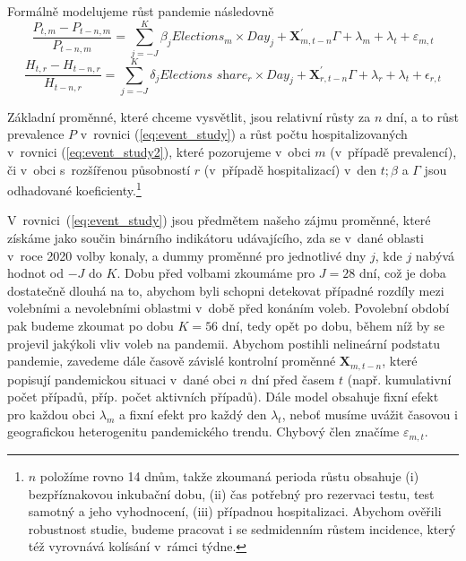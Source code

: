 Formálně modelujeme růst pandemie následovně
\begin{equation}
\label{eq:event_study}
\frac{P_{t,m} - P_{t-n,m}}{P_{t-n,m}} = \sum_{j=-J}^{K} \beta_j \textit{Elections}_m \times Day_j + \textbf{X}_{m,t-n}^{'}\Gamma + \lambda_{m} + \lambda_{t} + \varepsilon_{m,t}
\end{equation}
\begin{equation}
\label{eq:event_study2}
\frac{H_{t,r} - H_{t-n,r}}{H_{t-n,r}} = \sum_{j=-J}^{K} \delta_j \textit{Elections share}_r \times Day_j + \textbf{X}_{r,t-n}^{'}\Gamma + \lambda_{r} + \lambda_{t} + \epsilon_{r,t}
\end{equation}

Základní proměnné, které chceme vysvětlit, jsou relativní růsty za $n$ dní, a to růst prevalence $P$ v~rovnici (\ref{eq:event_study}) a růst počtu hospitalizovaných v~rovnici (\ref{eq:event_study2}), které pozorujeme v~obci $m$ (v~případě prevalencí), či v~obci s~rozšířenou působností $r$ (v~případě hospitalizací) v~den $t; \beta$ a $\Gamma$ jsou odhadované koeficienty.\footnote{$n$ položíme rovno 14 dnům, takže zkoumaná perioda růstu obsahuje
(i) bezpříznakovou inkubační dobu\cite{lauer_et_al2020}, (ii) čas potřebný pro rezervaci testu, test samotný a jeho vyhodnocení, (iii) případnou hospitalizaci. Abychom ověřili robustnost studie, budeme pracovat i se sedmidenním růstem incidence, který též vyrovnává kolísání v~rámci týdne.}


V~rovnici~(\ref{eq:event_study}) jsou předmětem našeho zájmu proměnné, které získáme jako součin binárního indikátoru udávajícího, zda se v~dané oblasti v~roce 2020 volby konaly, a dummy proměnné pro jednotlivé dny $j$, kde $j$ nabývá hodnot od $-J$ do $K$. 
Dobu před volbami zkoumáme pro $J=28$ dní, což je doba dostatečně dlouhá na to, abychom byli schopni detekovat případné rozdíly mezi volebními a nevolebními oblastmi v~době před konáním voleb. Povolební období pak budeme zkoumat po dobu $K=56$ dní, tedy opět po dobu, během níž by se projevil jakýkoli vliv voleb na pandemii. Abychom postihli nelineární podstatu pandemie, zavedeme dále časově závislé kontrolní proměnné $\textbf{X}_{m,t-n}$, které popisují pandemickou situaci v~dané obci $n$ dní před časem $t$ (např. kumulativní počet případů, příp. počet aktivních případů). Dále model obsahuje fixní efekt pro každou obci $\lambda_{m}$ a fixní efekt pro každý den $\lambda_{t}$, neboť musíme uvážit časovou i geografickou heterogenitu pandemického trendu. Chybový člen značíme
 $\varepsilon_{m,t}$.


